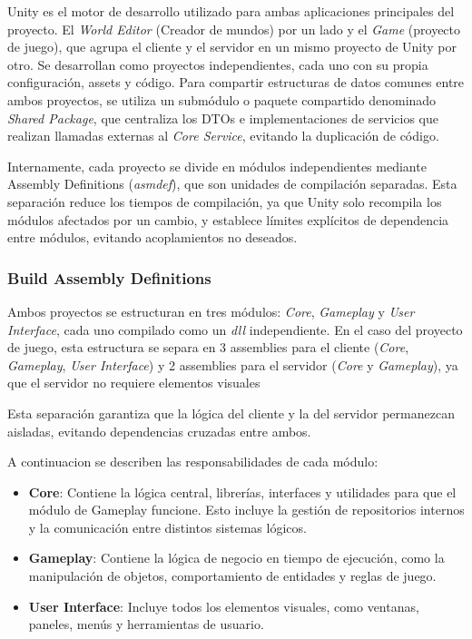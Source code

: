Unity es el motor de desarrollo utilizado para ambas aplicaciones principales del proyecto. El \textit{World Editor} (Creador de mundos) por un lado y el \textit{Game}
(proyecto de juego), que agrupa el cliente y el servidor en un mismo proyecto de Unity por otro. Se desarrollan como 
proyectos independientes, cada uno con su propia configuración, assets y código. Para compartir estructuras 
de datos comunes entre ambos proyectos, se utiliza un submódulo o paquete compartido denominado \textit{Shared Package}, 
que centraliza los DTOs e implementaciones de servicios que realizan llamadas externas al \textit{Core Service}, 
evitando la duplicación de código.

Internamente, cada proyecto se divide en módulos independientes mediante Assembly Definitions 
(\textit{asmdef}), que son unidades de compilación separadas. Esta separación reduce los tiempos de 
compilación, ya que Unity solo recompila los módulos afectados por un cambio, y establece límites explícitos 
de dependencia entre módulos, evitando acoplamientos no deseados.

\subsubsection{Build Assembly Definitions}

Ambos proyectos se estructuran en tres módulos: \textit{Core}, \textit{Gameplay} y \textit{User Interface}, 
cada uno compilado como un \textit{dll} independiente. En el caso del proyecto de juego, esta estructura se 
separa en 3 assemblies para el cliente (\textit{Core}, \textit{Gameplay}, \textit{User Interface}) y 
2 assemblies para el servidor (\textit{Core} y \textit{Gameplay}), ya que el servidor no requiere elementos visuales

Esta separación garantiza que la lógica del cliente y la del servidor permanezcan aisladas, evitando dependencias 
cruzadas entre ambos.

A continuacion se describen las responsabilidades de cada módulo:

\begin{itemize}
  \item \textbf{Core}: Contiene la lógica central, librerías, interfaces y utilidades para que el módulo de Gameplay funcione. Esto incluye la gestión de repositorios internos y la comunicación entre distintos sistemas lógicos.
  \item \textbf{Gameplay}: Contiene la lógica de negocio en tiempo de ejecución, como la manipulación de objetos, comportamiento de entidades y reglas de juego.
  \item \textbf{User Interface}: Incluye todos los elementos visuales, como ventanas, paneles, menús y herramientas de usuario.
\end{itemize}

